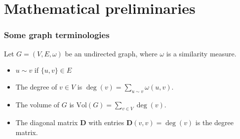 \documentclass[professionalfonts, hyperref={pdfpagelabels=false,
  colorlinks=true, linkcolor=purple}]{beamer}
\begin{document}
\section{Mathematical preliminaries}
\begin{frame}[label=graph_terminology]
  \frametitle{Some graph terminologies}
  Let $G = (V,E,\omega)$ be an undirected graph, where
  $\omega$ is a similarity measure.
  \begin{itemize}
  \item $u \sim v$ if $\{u,v\} \in E$ 
  \item The degree of $v \in V$ is $\deg(v) = \sum_{u \sim
      v}{\omega(u,v)}$.
  \item The volume of $G$ is $\mathrm{Vol}(G) = \sum_{v \in
      V}{\deg(v)}$.
  \item The diagonal matrix $\bm{D}$ with entries $\bm{D}(v,v) =
    \deg(v)$ is the degree matrix. 
  \end{itemize}
\end{frame}
\end{document}
